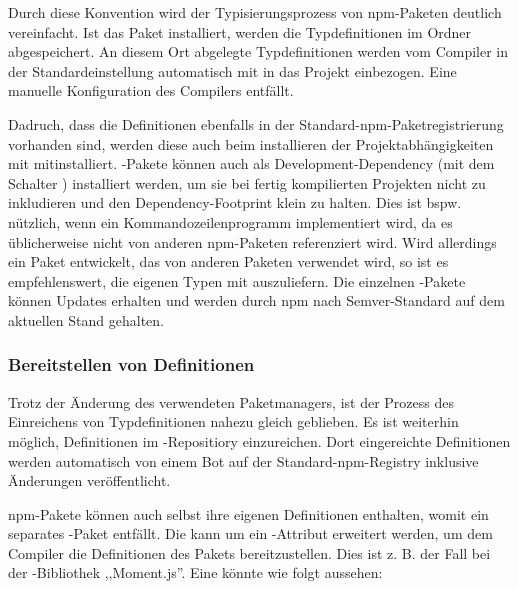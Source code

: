
Durch diese Konvention wird der Typisierungsprozess von npm-Paketen deutlich vereinfacht. Ist das Paket installiert, werden die Typdefinitionen im Ordner  abgespeichert. An diesem Ort abgelegte Typdefinitionen werden vom Compiler in der Standardeinstellung automatisch mit in das Projekt einbezogen. Eine manuelle Konfiguration des Compilers entfällt.

Dadruch, dass die Definitionen ebenfalls in der Standard-npm-Paketregistrierung vorhanden sind, werden diese auch beim installieren der Projektabhängigkeiten mit  mitinstalliert. -Pakete können auch als Development-Dependency (mit dem Schalter ) installiert werden, um sie bei fertig kompilierten Projekten nicht zu inkludieren und den Dependency-Footprint klein zu halten. Dies ist bspw. nützlich, wenn ein Kommandozeilenprogramm implementiert wird, da es üblicherweise nicht von	 anderen npm-Paketen referenziert wird. Wird allerdings ein Paket entwickelt, das von anderen Paketen verwendet wird, so ist es empfehlenswert, die eigenen Typen mit auszuliefern.
Die einzelnen -Pakete können Updates erhalten und werden durch npm nach Semver-Standard auf dem aktuellen Stand gehalten.

\subsubsection*{Bereitstellen von Definitionen}
Trotz der Änderung des verwendeten Paketmanagers, ist der Prozess des Einreichens von Typdefinitionen nahezu gleich geblieben. Es ist weiterhin möglich, Definitionen im \dt{}-Repositiory einzureichen. Dort eingereichte Definitionen werden automatisch von einem Bot auf der Stan\-dard-npm-Registry  inklusive Änderungen veröffentlicht.

npm-Pakete können auch selbst ihre eigenen Definitionen enthalten, womit ein separates -Paket entfällt. Die  kann um ein -Attribut erweitert werden, um dem Compiler die Definitionen des Pakets bereitzustellen. Dies ist z. B. der Fall bei der \js-Bibliothek ,,Moment.js''. Eine  könnte wie folgt aussehen:


